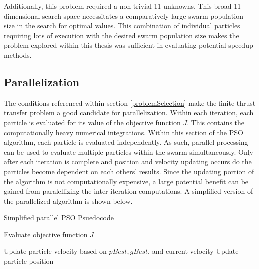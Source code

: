 Additionally, this problem required a non-trivial 11 unknowns. This broad 11 dimensional search space necessitates a comparatively large swarm population size
in the search for optimal values. This combination of individual particles requiring lots of execution with the desired swarm population size makes the problem explored within this thesis
was sufficient in evaluating potential speedup methods.

\subsection{Parallelization}

The conditions referenced within section \ref{problemSelection} make the finite thrust transfer problem a good candidate for parallelization.
Within each iteration, each particle is evaluated for its value of the objective function $J$. This  contains the computationally heavy numerical integrations. Within this section of the PSO algorithm, each particle is evaluated independently. 
As such, parallel processing can be used to evaluate multiple particles within the swarm simultaneously. Only after each iteration is complete and position and velocity updating occurs do the particles become dependent on each others' results. Since 
the updating portion of the algorithm is not computationally expensive, a large potential benefit can be gained from paralellizing the inter-iteration computations. A simplified version of the parallelized algorithm is shown below.

\begin{algorithm}[H]
    \caption{Simplified parallel PSO Psuedocode}
    \begin{algorithmic}
    \STATE Evaluate objective function $J$
    \hspace{17em}

    \ENDFOR
    \STATE Update particle velocity based on $pBest, gBest$, and current velocity
    \STATE Update particle position
    \ENDFOR
    \end{algorithmic}
    \label{alg:PPSOpsuedocode}
\end{algorithm}

\newpage
